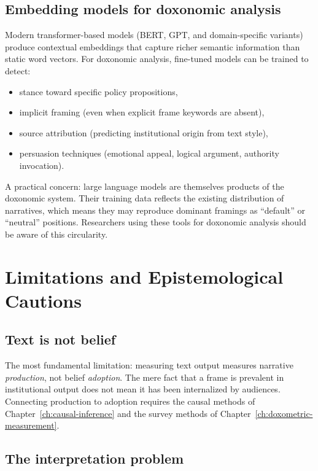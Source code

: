 \subsection{Embedding models for doxonomic analysis}

Modern transformer-based models (BERT, GPT, and domain-specific variants) produce contextual embeddings that capture richer semantic information than static word vectors.
For doxonomic analysis, fine-tuned models can be trained to detect:
\begin{itemize}[nosep]
  \item stance toward specific policy propositions,
  \item implicit framing (even when explicit frame keywords are absent),
  \item source attribution (predicting institutional origin from text style),
  \item persuasion techniques (emotional appeal, logical argument, authority invocation).
\end{itemize}

A practical concern: large language models are themselves products of the doxonomic system.
Their training data reflects the existing distribution of narratives, which means they may reproduce dominant framings as ``default'' or ``neutral'' positions.
Researchers using these tools for doxonomic analysis should be aware of this circularity.

\section{Limitations and Epistemological Cautions}
\label{sec:ch17-limits}

\subsection{Text is not belief}

The most fundamental limitation: measuring text output measures narrative \emph{production}, not belief \emph{adoption}.
The mere fact that a frame is prevalent in institutional output does not mean it has been internalized by audiences.
Connecting production to adoption requires the causal methods of Chapter~\ref{ch:causal-inference} and the survey methods of Chapter~\ref{ch:doxometric-measurement}.

\subsection{The interpretation problem}

